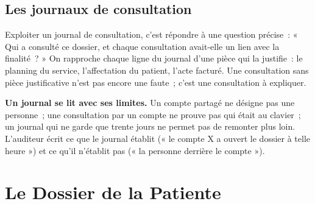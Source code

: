 \subsection{Les journaux de consultation}

Exploiter un journal de consultation, c'est répondre à une question précise~:
« Qui a consulté ce dossier, et chaque consultation avait-elle un lien avec
la finalité~? » On rapproche chaque ligne du journal d'une pièce qui la
justifie~: le planning du service, l'affectation du patient, l'acte facturé.
Une consultation sans pièce justificative n'est pas encore une faute~; c'est
une consultation à expliquer.

\begin{boxinfo}
\textbf{Un journal se lit avec ses limites.} Un compte partagé ne désigne pas
une personne~; une consultation par un compte ne prouve pas qui était au
clavier~; un journal qui ne garde que trente jours ne permet pas de
remonter plus loin. L'auditeur écrit ce que le journal établit (« le compte
X a ouvert le dossier à telle heure ») et ce qu'il n'établit pas (« la
personne derrière le compte »).
\end{boxinfo}

\section{Le Dossier de la Patiente}
\label{sec:c07-mbolo}

